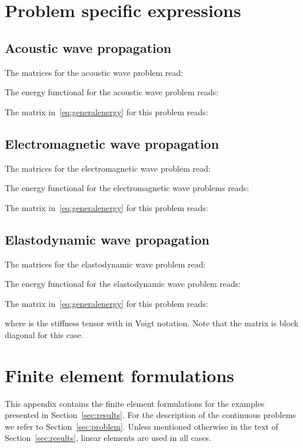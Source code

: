 \documentclass[a4paper]{article}
\begin{document}
\section{Problem specific expressions}
\label{sec:specifics}


\subsection{Acoustic wave propagation}

The matrices  for the acoustic wave problem read:

The energy functional for the acoustic wave problem reads:

The matrix  in~\eqref{eq:generalenergy} for this problem reads:


\subsection{Electromagnetic wave propagation}

The matrices  for the electromagnetic wave problem read:

The energy functional for the electromagnetic wave problems reads:

The matrix  in~\eqref{eq:generalenergy} for this problem reads:


\subsection{Elastodynamic wave propagation}

The matrices  for the elastodynamic wave problem read:

The energy functional for the elastodynamic wave problem reads:

The matrix  in~\eqref{eq:generalenergy} for this problem reads:

where  is the stiffness tensor with in Voigt notation.
Note that the matrix  is block diagonal for this case.

\section{Finite element formulations}
\label{sec:fem}

This appendix contains the finite element formulations for the
examples presented in Section~\ref{sec:results}. For the description
of the continuous problems we refer to
Section~\ref{sec:problem}. Unless mentioned otherwise in the text of
Section~\ref{sec:results}, linear elements are used in all cases.
\end{document}
